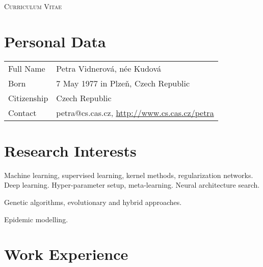 \documentclass[a4paper, oneside, final]{scrartcl} %
\begin{document}


\noindent
{\fontsize{18}{18}\selectfont\scshape Curriculum Vitae} 



\section{Personal Data}
\begin{tabularx}{0.97\linewidth}{>{\raggedright}p{2cm}X}
Full Name & 	Petra Vidnerov\'a, n\'ee Kudov\'a\\
Born & 7 May 1977 in Plze\v{n}, Czech Republic\\
Citizenship 	& Czech Republic\\
Contact & petra@cs.cas.cz, \href{http://www.cs.cas.cz/petra}{http://www.cs.cas.cz/petra}
\end{tabularx}



\section{Research Interests}

Machine learning, supervised learning, kernel methods, regularization networks.
Deep learning. Hyper-parameter setup, meta-learning. Neural architecture search.

\noindent
Genetic algorithms, evolutionary and hybrid approaches.

\noindent
Epidemic modelling.


\section{Work Experience}
\end{document}
